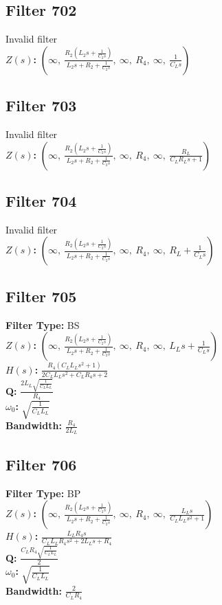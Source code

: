 \documentclass{article}
\begin{document}
\subsection*{Filter 702}
Invalid filter \\ 
\textbf{$Z(s)$:} $\left( \infty, \  \frac{R_{2} \left(L_{2} s + \frac{1}{C_{2} s}\right)}{L_{2} s + R_{2} + \frac{1}{C_{2} s}}, \  \infty, \  R_{4}, \  \infty, \  \frac{1}{C_{L} s}\right)$ \\ 
\subsection*{Filter 703}
Invalid filter \\ 
\textbf{$Z(s)$:} $\left( \infty, \  \frac{R_{2} \left(L_{2} s + \frac{1}{C_{2} s}\right)}{L_{2} s + R_{2} + \frac{1}{C_{2} s}}, \  \infty, \  R_{4}, \  \infty, \  \frac{R_{L}}{C_{L} R_{L} s + 1}\right)$ \\ 
\subsection*{Filter 704}
Invalid filter \\ 
\textbf{$Z(s)$:} $\left( \infty, \  \frac{R_{2} \left(L_{2} s + \frac{1}{C_{2} s}\right)}{L_{2} s + R_{2} + \frac{1}{C_{2} s}}, \  \infty, \  R_{4}, \  \infty, \  R_{L} + \frac{1}{C_{L} s}\right)$ \\ 
\subsection*{Filter 705}
\textbf{Filter Type:} BS \\ 
\textbf{$Z(s)$:} $\left( \infty, \  \frac{R_{2} \left(L_{2} s + \frac{1}{C_{2} s}\right)}{L_{2} s + R_{2} + \frac{1}{C_{2} s}}, \  \infty, \  R_{4}, \  \infty, \  L_{L} s + \frac{1}{C_{L} s}\right)$ \\ 
\textbf{$H(s)$:} $\frac{R_{4} \left(C_{L} L_{L} s^{2} + 1\right)}{2 C_{L} L_{L} s^{2} + C_{L} R_{4} s + 2}$ \\ 
\textbf{Q:} $\frac{2 L_{L} \sqrt{\frac{1}{C_{L} L_{L}}}}{R_{4}}$ \\ 
\textbf{$\omega_0$:} $\sqrt{\frac{1}{C_{L} L_{L}}}$ \\ 
\textbf{Bandwidth:} $\frac{R_{4}}{2 L_{L}}$ \\ 
\subsection*{Filter 706}
\textbf{Filter Type:} BP \\ 
\textbf{$Z(s)$:} $\left( \infty, \  \frac{R_{2} \left(L_{2} s + \frac{1}{C_{2} s}\right)}{L_{2} s + R_{2} + \frac{1}{C_{2} s}}, \  \infty, \  R_{4}, \  \infty, \  \frac{L_{L} s}{C_{L} L_{L} s^{2} + 1}\right)$ \\ 
\textbf{$H(s)$:} $\frac{L_{L} R_{4} s}{C_{L} L_{L} R_{4} s^{2} + 2 L_{L} s + R_{4}}$ \\ 
\textbf{Q:} $\frac{C_{L} R_{4} \sqrt{\frac{1}{C_{L} L_{L}}}}{2}$ \\ 
\textbf{$\omega_0$:} $\sqrt{\frac{1}{C_{L} L_{L}}}$ \\ 
\textbf{Bandwidth:} $\frac{2}{C_{L} R_{4}}$ \\ 
\end{document}
